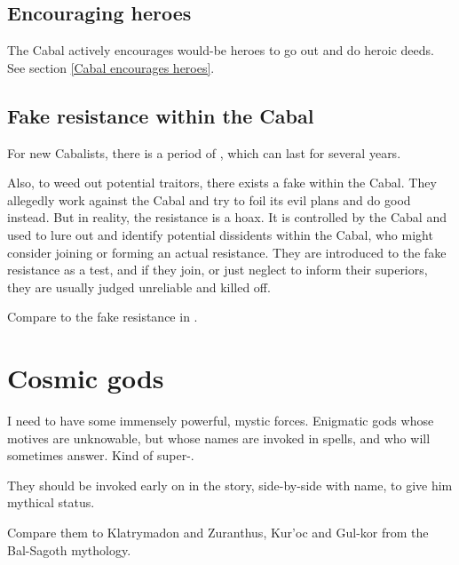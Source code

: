 \subsection{Encouraging heroes}
The Cabal actively encourages would-be heroes to go out and do heroic deeds. See section \ref{Cabal encourages heroes}. 







\subsection{Fake resistance within the Cabal}
For new Cabalists, there is a period of , which can last for several years. 

Also, to weed out potential traitors, there exists a fake  within the Cabal. They allegedly work against the Cabal and try to foil its evil plans and do good instead. But in reality, the resistance is a hoax. It is controlled by the Cabal and used to lure out and identify potential dissidents within the Cabal, who might consider joining or forming an actual resistance. They are introduced to the fake resistance as a test, and if they join, or just neglect to inform their superiors, they are usually judged unreliable and killed off. 

Compare to the fake resistance in .















\section{Cosmic gods}
\label{Cosmic gods}
\label{Cosmic god}
\label{cosmic gods}
\label{cosmic god}
\label{Klatrymadon}
I need to have some immensely powerful, mystic forces. Enigmatic gods whose motives are unknowable, but whose names are invoked in spells, and who will sometimes answer. Kind of super-\Qliphoth. 

They should be invoked early on in the story, side-by-side with \Ishnaz{} name, to give him mythical status. 

Compare them to Klatrymadon and Zuranthus, Kur'oc and Gul-kor from the Bal-Sagoth mythology.

